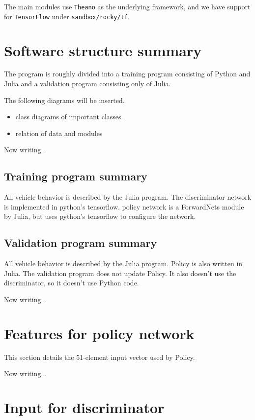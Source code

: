 The main modules use {\tt Theano} as the underlying framework, and we have support for {\tt TensorFlow} under {\tt sandbox/rocky/tf}.


\section{Software structure summary}

The program is roughly divided into a training program consisting of Python and Julia and a validation program consisting only of Julia.

The following diagrams will be inserted.
\begin{itemize}
\item class diagrams of important classes.
\item relation of data and modules
\end{itemize}




Now writing...


\subsection{Training program summary}

All vehicle behavior is described by the Julia program. The discriminator network is implemented in python's tensorflow.
policy network is a ForwardNets module by Julia, but uses python's tensorflow to configure the network.



\subsection{Validation program summary}

All vehicle behavior is described by the Julia program. 
Policy is also written in Julia.
The validation program does not update Policy. It also doesn't use the discriminator, so it doesn't use Python code.

Now writing...


\section{Features for policy network}


This section details the 51-element input vector used by Policy.

Now writing...

\section{Input for discriminator}


